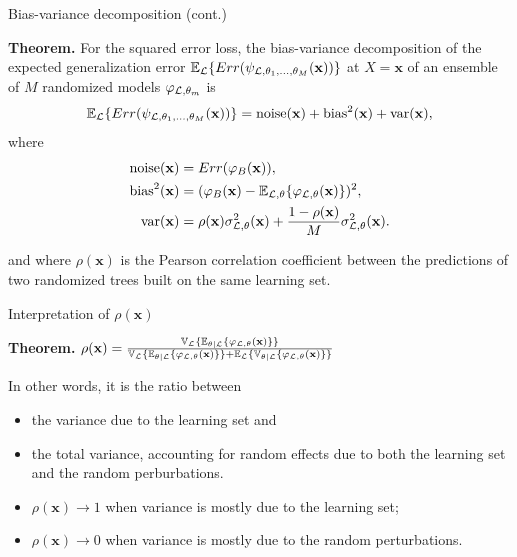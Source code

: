 \documentclass{beamer}
\begin{document}
\begin{frame}{Bias-variance decomposition (cont.)}

{\bf Theorem.}
For the squared error loss, the bias-variance decomposition of the expected
generalization error $\mathbb{E}_{\cal L} \{ Err( \psi_{{\cal L},\theta_1,\dots,\theta_M}(\mathbf{x}))
\}$ at $X=\mathbf{x}$ of an ensemble of $M$ randomized models $\varphi_{{\cal L},\theta_m}$ is
\begin{equation*}
\mathbb{E}_{\cal L} \{ Err(\psi_{{\cal L},\theta_1,\dots,\theta_M}(\mathbf{x})) \} = \text{noise}(\mathbf{x}) + \text{bias}^2(\mathbf{x}) + \text{var}(\mathbf{x}),
\end{equation*}
where
\begin{align*}
\text{noise}(\mathbf{x}) &= Err(\varphi_B(\mathbf{x})), \\
\text{bias}^2(\mathbf{x}) &= (\varphi_B(\mathbf{x}) - \mathbb{E}_{{\cal L},\theta} \{ \varphi_{{\cal L},\theta}(\mathbf{x}) \} )^2, \\
\text{var}(\mathbf{x}) &= \rho(\mathbf{x}) \sigma^2_{{\cal L},\theta}(\mathbf{x}) + \frac{1 - \rho(\mathbf{x})}{M} \sigma^2_{{\cal L},\theta}(\mathbf{x}).
\end{align*}

and where $\rho(\mathbf{x})$ is the Pearson correlation coefficient between
the predictions of two randomized trees built on the same learning set.

\end{frame}

\begin{frame}{Interpretation of $\rho(\mathbf{x})$}

{\bf Theorem.} $\rho(\mathbf{x}) = \frac{\mathbb{V}_{\cal L} \{ \mathbb{E}_{\theta|{\cal L}} \{ \varphi_{{\cal L},\theta}(\mathbf{x}) \} \}}{\mathbb{V}_{\cal L} \{ \mathbb{E}_{\theta|{\cal L}} \{ \varphi_{{\cal L},\theta}(\mathbf{x}) \} \} + \mathbb{E}_{\cal L} \{ \mathbb{V}_{\theta|{\cal L}} \{ \varphi_{{\cal L},\theta}(\mathbf{x}) \} \}}$

\vspace{1cm}

In other words, it is the ratio between
\begin{itemize}
\item the variance due to the learning set and
\item the total variance, accounting for random effects due to both the
  learning set and the random perburbations.
\end{itemize}

\begin{itemize}
\item $\rho(\mathbf{x}) \to 1$ when variance is mostly due to the learning set;
\item $\rho(\mathbf{x}) \to 0$ when variance is mostly due to the random perturbations.
\end{itemize}

\end{frame}
\end{document}
